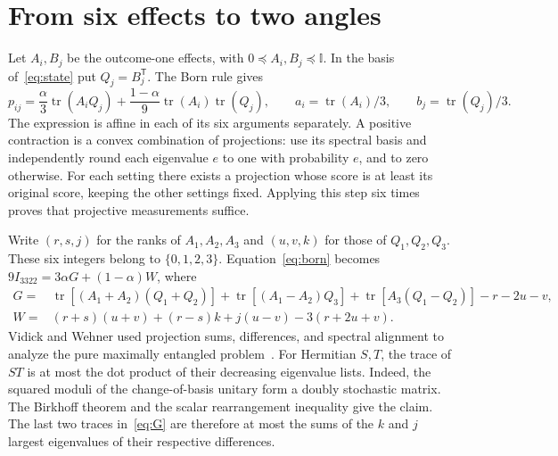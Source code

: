 \documentclass[11pt]{article}
\newcommand{\tr}{\operatorname{tr}}
\newcommand{\id}{\mathbb I}
\begin{document}
\section{From six effects to two angles}
Let $A_i,B_j$ be the outcome-one effects, with $0\preceq A_i,B_j\preceq\id$. In the basis of~\eqref{eq:state} put $Q_j=B_j^{\mathsf T}$. The Born rule gives
\begin{equation}
 p_{ij}=\frac\alpha3\tr(A_i Q_j)
      +\frac{1-\alpha}{9}\tr(A_i)\tr(Q_j),\qquad
 a_i=\tr(A_i)/3,\qquad b_j=\tr(Q_j)/3 .                       \label{eq:born}
\end{equation}
The expression is affine in each of its six arguments separately. A positive contraction is a convex combination of projections: use its spectral basis and independently round each eigenvalue $e$ to one with probability $e$, and to zero otherwise. For each setting there exists a projection whose score is at least its original score, keeping the other settings fixed. Applying this step six times proves that projective measurements suffice.

Write $(r,s,j)$ for the ranks of $A_1,A_2,A_3$ and $(u,v,k)$ for those of $Q_1,Q_2,Q_3$. These six integers belong to $\{0,1,2,3\}$. Equation~\eqref{eq:born} becomes $9I_{3322}=3\alpha G+(1-\alpha)W$, where
\begin{align}
G={}&\tr[(A_1+A_2)(Q_1+Q_2)]+\tr[(A_1-A_2)Q_3]
       +\tr[A_3(Q_1-Q_2)]-r-2u-v,                             \label{eq:G}\\
W={}&(r+s)(u+v)+(r-s)k+j(u-v)-3(r+2u+v).                    \label{eq:W}
\end{align}
Vidick and Wehner used projection sums, differences, and spectral alignment to analyze the pure maximally entangled problem~\cite[App.~A]{vw}. For Hermitian $S,T$, the trace of $ST$ is at most the dot product of their decreasing eigenvalue lists. Indeed, the squared moduli of the change-of-basis unitary form a doubly stochastic matrix. The Birkhoff theorem and the scalar rearrangement inequality give the claim. The last two traces in~\eqref{eq:G} are therefore at most the sums of the $k$ and $j$ largest eigenvalues of their respective differences.
\end{document}
